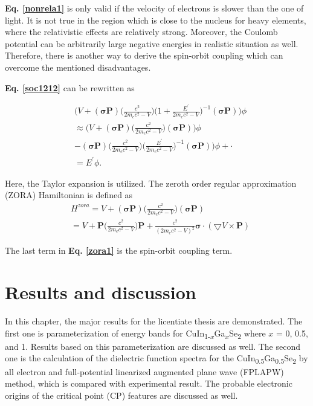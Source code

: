 \documentclass[a4paper, 12pt, titlepage,oneside,drop]{kthesis}
\begin{document}
\textbf{Eq. \ref{nonrela1}} is only valid if the velocity of electrons is slower than the one of light. It is not true in the region which is close to the nucleus for heavy elements, where the relativistic effects
are relatively strong. Moreover, the Coulomb potential can be arbitrarily large negative energies in realistic situation as well. Therefore, there is another way to derive 
the spin-orbit coupling which can overcome the mentioned disadvantages.

\textbf{Eq. \ref{soc1212}} can be rewritten as

\begin{equation}\begin{split}\label{soc001}
& \Big(V + (\boldsymbol{\sigma} \textbf{P}) \Big(\frac{c^2}{2m_ec^2-V}\Big)\Big(1+\frac{E^{\prime}}{2m_ec^2-V}\Big)^{-1} (\boldsymbol{\sigma} \textbf{P}) \Big)\phi \\
& \approx \Big( V + (\boldsymbol{\sigma} \textbf{P}) \Big(\frac{c^2}{2m_ec^2-V}\Big)(\boldsymbol{\sigma} \textbf{P}) \Big)\phi \\
& - (\boldsymbol{\sigma} \textbf{P}) \Big(\frac{c^2}{2m_ec^2-V}\Big)\Big(\frac{E^{\prime}}{2m_ec^2-V}\Big)^{-1} (\boldsymbol{\sigma} \textbf{P}) \Big)\phi + \cdot \\
& =E^{\prime}\phi.
\end{split}
\end{equation}

Here, the Taylor expansion is utilized. The zeroth order regular approximation (ZORA) Hamiltonian is defined as
\begin{equation}\begin{split}\label{zora1}
& H^{zora} = V + (\boldsymbol{\sigma} \textbf{P}) \Big(\frac{c^2}{2m_ec^2-V}\Big)(\boldsymbol{\sigma} \textbf{P}) \\
& =  V + \textbf{P} \Big(\frac{c^2}{2m_ec^2-V}\Big)\textbf{P} + \frac{c^2}{(2m_ec^2-V)^2} \boldsymbol{\sigma}\cdot(\bigtriangledown V\times \textbf{P})
 \end{split}
\end{equation}

The last term in \textbf{Eq. \ref{zora1}} is the spin-orbit coupling term.


\chapter{Results and discussion}

In this chapter, the major results for the licentiate thesis are demonstrated. The first one is parameterization of energy bands for CuIn{\textsubscript{1-$x$}}Ga{\textsubscript{$x$}}Se\textsubscript{2}
where $x$ = 0, 0.5, and 1. Results based on this parameterization are discussed as well. The second one is the calculation of the dielectric function spectra for the
CuIn{\textsubscript{0.5}}Ga{\textsubscript{0.5}}Se\textsubscript{2} by all electron and full-potential linearized augmented plane wave (FPLAPW) method, which is compared with experimental result.
The probable electronic origins of the critical point (CP) features are discussed as well.
\end{document}
